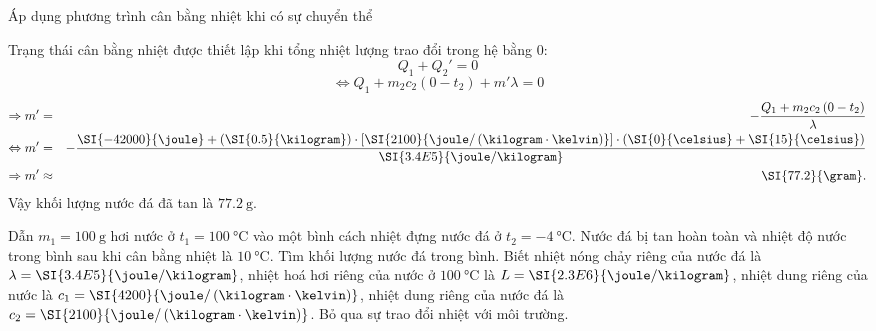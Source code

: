 \begin{dang}{Áp dụng phương trình cân bằng nhiệt khi có sự chuyển thể}
{{\begin{enumerate}[label=\alph*)]
		Trạng thái cân bằng nhiệt được thiết lập khi tổng nhiệt lượng trao đổi trong hệ bằng 0:
		$$Q_1+Q_2'=0$$
		$$\Leftrightarrow Q_1+m_2c_2\left(0-t_2\right)+m'\lambda=0$$
		\begin{eqnarray*}
			\Rightarrow m'&=&-\dfrac{Q_1+m_2c_2\left(0-t_2\right)}{\lambda}\\
			\Leftrightarrow m'&=&-\dfrac{\SI{-42000}{\joule}+\left(\SI{0.5}{\kilogram}\right)\cdot\left[\SI{2100}{\joule/\left(\kilogram\cdot\kelvin\right)}\right]\cdot\left(\SI{0}{\celsius}+\SI{15}{\celsius}\right)}{\SI{3.4E5}{\joule/\kilogram}}\\
			\Rightarrow m'&\approx&\SI{77.2}{\gram}.
		\end{eqnarray*}
	Vậy khối lượng nước đá đã tan là $\SI{77.2}{\gram}$.
	
		
	\end{enumerate}}
}

{Dẫn $m_1=\SI{100}{\gram}$ hơi nước ở $t_1=\SI{100}{\celsius}$ vào một bình cách nhiệt đựng nước đá ở $t_2=\SI{-4}{\celsius}$. Nước đá bị tan hoàn toàn và nhiệt độ nước trong bình sau khi cân bằng nhiệt là $\SI{10}{\celsius}$. Tìm khối lượng nước đá trong bình. Biết nhiệt nóng chảy riêng của nước đá là $\lambda=\SI{3.4E5}{\joule/\kilogram}$, nhiệt hoá hơi riêng của nước ở $\SI{100}{\celsius}$ là $L=\SI{2.3E6}{\joule/\kilogram}$, nhiệt dung riêng của nước là $c_1=\SI{4200}{\joule/\left(\kilogram\cdot\kelvin\right)}$, nhiệt dung riêng của nước đá là $c_2=\SI{2100}{\joule/\left(\kilogram\cdot\kelvin\right)}$. Bỏ qua sự trao đổi nhiệt với môi trường.

}
{
}
	
\end{dang}